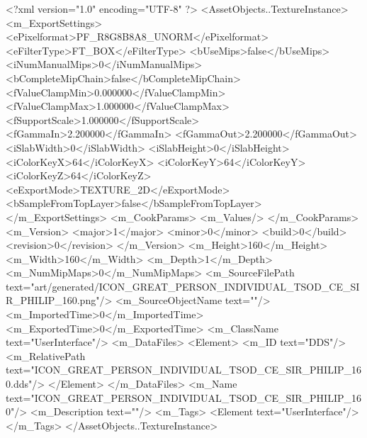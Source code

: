 <?xml version="1.0" encoding="UTF-8" ?>
<AssetObjects..TextureInstance>
	<m_ExportSettings>
		<ePixelformat>PF_R8G8B8A8_UNORM</ePixelformat>
		<eFilterType>FT_BOX</eFilterType>
		<bUseMips>false</bUseMips>
		<iNumManualMips>0</iNumManualMips>
		<bCompleteMipChain>false</bCompleteMipChain>
		<fValueClampMin>0.000000</fValueClampMin>
		<fValueClampMax>1.000000</fValueClampMax>
		<fSupportScale>1.000000</fSupportScale>
		<fGammaIn>2.200000</fGammaIn>
		<fGammaOut>2.200000</fGammaOut>
		<iSlabWidth>0</iSlabWidth>
		<iSlabHeight>0</iSlabHeight>
		<iColorKeyX>64</iColorKeyX>
		<iColorKeyY>64</iColorKeyY>
		<iColorKeyZ>64</iColorKeyZ>
		<eExportMode>TEXTURE_2D</eExportMode>
		<bSampleFromTopLayer>false</bSampleFromTopLayer>
	</m_ExportSettings>
	<m_CookParams>
		<m_Values/>
	</m_CookParams>
	<m_Version>
		<major>1</major>
		<minor>0</minor>
		<build>0</build>
		<revision>0</revision>
	</m_Version>
	<m_Height>160</m_Height>
	<m_Width>160</m_Width>
	<m_Depth>1</m_Depth>
	<m_NumMipMaps>0</m_NumMipMaps>
	<m_SourceFilePath text="art/generated/ICON_GREAT_PERSON_INDIVIDUAL_TSOD_CE_SIR_PHILIP_160.png"/>
	<m_SourceObjectName text=""/>
	<m_ImportedTime>0</m_ImportedTime>
	<m_ExportedTime>0</m_ExportedTime>
	<m_ClassName text="UserInterface"/>
	<m_DataFiles>
		<Element>
			<m_ID text="DDS"/>
			<m_RelativePath text="ICON_GREAT_PERSON_INDIVIDUAL_TSOD_CE_SIR_PHILIP_160.dds"/>
		</Element>
	</m_DataFiles>
	<m_Name text="ICON_GREAT_PERSON_INDIVIDUAL_TSOD_CE_SIR_PHILIP_160"/>
	<m_Description text=""/>
	<m_Tags>
		<Element text="UserInterface"/>
	</m_Tags>
</AssetObjects..TextureInstance>
